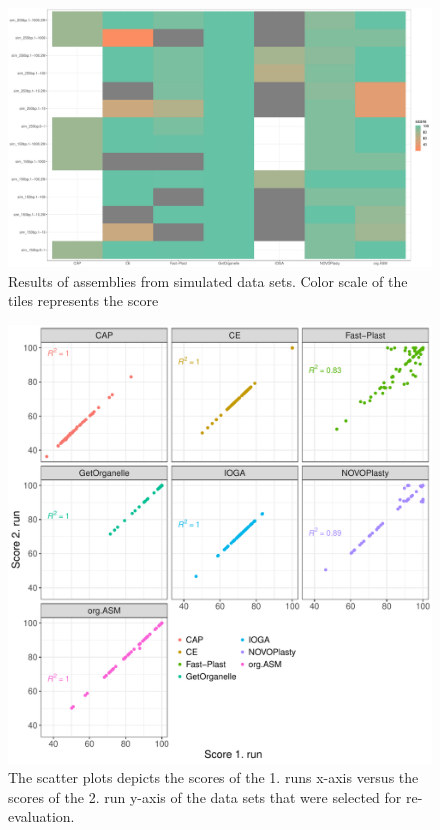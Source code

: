 \documentclass{bmcart}
\begin{document}
\begin{backmatter}
\begin{figure}[h!]
  \includegraphics[width=\textwidth]{plots/sim_tiles.pdf}
  \caption{
      Results of assemblies from simulated data sets. Color scale of the tiles represents the score }
      \label{fig:simulated}
      \end{figure}

\begin{figure}[h!]
  \includegraphics[width=\textwidth]{plots/repro.pdf}
  \caption{
  The scatter plots depicts the scores of the 1. runs x-axis versus the scores of the 2. run y-axis of the data sets that were selected for re-evaluation. 
      }
      \label{fig:reproducibility}
      \end{figure}


\end{backmatter}
\end{document}
